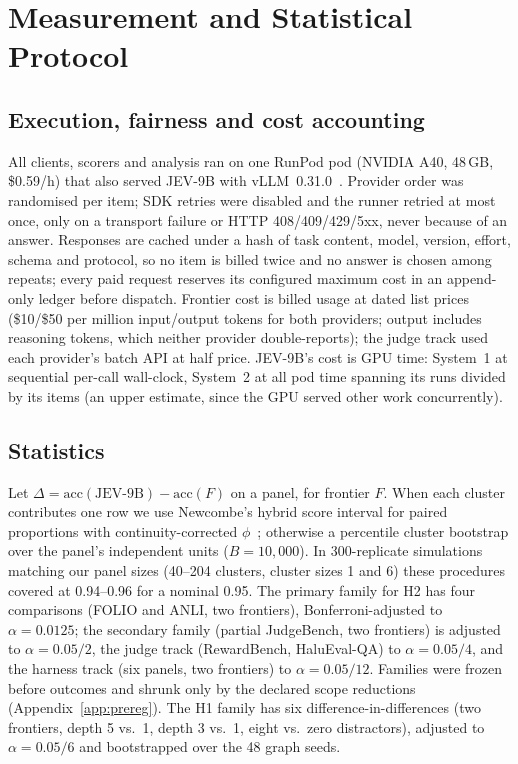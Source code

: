 \section{Measurement and Statistical Protocol}
\label{sec:protocol}

\subsection{Execution, fairness and cost accounting}
All clients, scorers and analysis ran on one RunPod pod (NVIDIA A40, 48\,GB, \$0.59/h) that also served JEV-9B with vLLM~0.31.0~\citep{vllm}.
Provider order was randomised per item; SDK retries were disabled and the runner retried at most once, only on a transport failure or HTTP 408/409/429/5xx, never because of an answer.
Responses are cached under a hash of task content, model, version, effort, schema and protocol, so no item is billed twice and no answer is chosen among repeats; every paid request reserves its configured maximum cost in an append-only ledger before dispatch.
Frontier cost is billed usage at dated list prices (\$10/\$50 per million input/output tokens for both providers; output includes reasoning tokens, which neither provider double-reports); the judge track used each provider's batch API at half price.
JEV-9B's cost is GPU time: System~1 at sequential per-call wall-clock, System~2 at all pod time spanning its runs divided by its items (an upper estimate, since the GPU served other work concurrently).

\subsection{Statistics}
\label{sec:stats}
Let $\Delta=\mathrm{acc}(\text{JEV-9B})-\mathrm{acc}(F)$ on a panel, for frontier $F$.
When each cluster contributes one row we use Newcombe's hybrid score interval for paired proportions with continuity-corrected $\phi$~\citep{newcombe1998}; otherwise a percentile cluster bootstrap over the panel's independent units ($B=10{,}000$).
In 300-replicate simulations matching our panel sizes (40--204 clusters, cluster sizes 1 and 6) these procedures covered at 0.94--0.96 for a nominal 0.95.
The primary family for H2 has four comparisons (FOLIO and ANLI, two frontiers), Bonferroni-adjusted to $\alpha=0.0125$; the secondary family (partial JudgeBench, two frontiers) is adjusted to $\alpha=0.05/2$, the judge track (RewardBench, HaluEval-QA) to $\alpha=0.05/4$, and the harness track (six panels, two frontiers) to $\alpha=0.05/12$. Families were frozen before outcomes and shrunk only by the declared scope reductions (Appendix~\ref{app:prereg}).
The H1 family has six difference-in-differences (two frontiers, depth 5 vs.\ 1, depth 3 vs.\ 1, eight vs.\ zero distractors), adjusted to $\alpha=0.05/6$ and bootstrapped over the 48 graph seeds.

